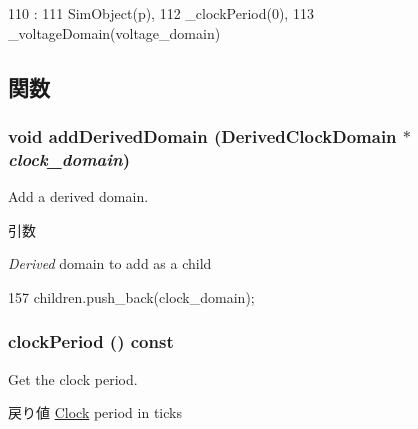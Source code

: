 \begin{DoxyCode}
110                                                                 :
111         SimObject(p),
112         _clockPeriod(0),
113         _voltageDomain(voltage_domain) {}

\end{DoxyCode}


\subsection{関数}
\hypertarget{classClockDomain_a62a05e20bb17524c79726cd41bd2f8b1}{
\subsubsection[{addDerivedDomain}]{\setlength{\rightskip}{0pt plus 5cm}void addDerivedDomain ({\bf DerivedClockDomain} $\ast$ {\em clock\_\-domain})}}
\label{classClockDomain_a62a05e20bb17524c79726cd41bd2f8b1}
Add a derived domain.


\begin{DoxyParams}{引数}
\item[{\em Derived}]domain to add as a child \end{DoxyParams}



\begin{DoxyCode}
157     { children.push_back(clock_domain); }
\end{DoxyCode}
\hypertarget{classClockDomain_a78c89cef17196c60470c4f2f76d43d8a}{
\subsubsection[{clockPeriod}]{ clockPeriod () const}}
\label{classClockDomain_a78c89cef17196c60470c4f2f76d43d8a}
Get the clock period.

\begin{DoxyReturn}{戻り値}
\hyperlink{classClock}{Clock} period in ticks 
\end{DoxyReturn}




